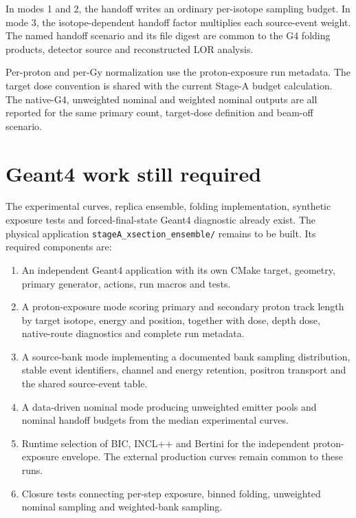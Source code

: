 \documentclass[11pt]{article}
\newcommand{\file}[1]{\texttt{#1}}
\begin{document}
In modes 1 and 2, the handoff writes an ordinary per-isotope sampling budget.
In mode 3, the isotope-dependent handoff factor multiplies each source-event
weight.  The named handoff scenario and its file digest are common to the G4
folding products, detector source and reconstructed LOR analysis.

Per-proton and per-Gy normalization use the proton-exposure run metadata.  The
target dose convention is shared with the current Stage-A budget calculation.
The native-G4, unweighted nominal and weighted nominal outputs are all reported
for the same primary count, target-dose definition and beam-off scenario.

\section{Geant4 work still required}

The experimental curves, replica ensemble, folding implementation, synthetic
exposure tests and forced-final-state Geant4 diagnostic already exist.  The
physical application \file{stageA\_xsection\_ensemble/} remains to be built.
Its required components are:

\begin{enumerate}
  \item An independent Geant4 application with its own CMake target, geometry,
        primary generator, actions, run macros and tests.

  \item A proton-exposure mode scoring primary and secondary proton track
        length by target isotope, energy and position, together with dose,
        depth dose, native-route diagnostics and complete run metadata.

  \item A source-bank mode implementing a documented bank sampling
        distribution, stable event identifiers, channel and energy retention,
        positron transport and the shared source-event table.

  \item A data-driven nominal mode producing unweighted emitter pools and
        nominal handoff budgets from the median experimental curves.

  \item Runtime selection of BIC, INCL++ and Bertini for the independent
        proton-exposure envelope.  The external production curves remain
        common to these runs.

  \item Closure tests connecting per-step exposure, binned folding,
        unweighted nominal sampling and weighted-bank sampling.
\end{enumerate}
\end{document}
